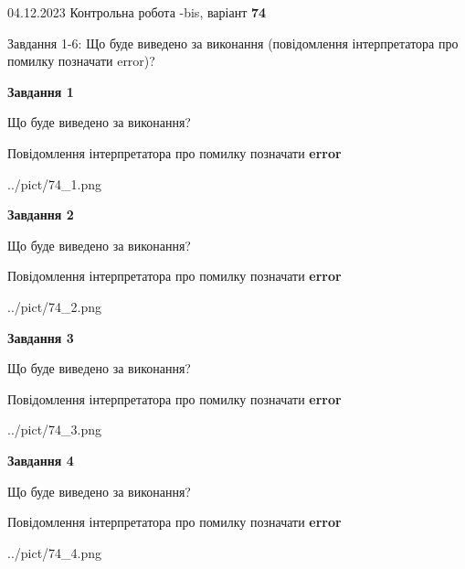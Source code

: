 \documentclass[12pt, ukrainian]{article}
\begin{document}
{{04.12.2023 Контрольна робота -bis, варіант  \No \textbf { 74 }\par}}
{

Завдання 1-6: Що буде виведено за виконання (повідомлення інтерпретатора про помилку позначати error)?


{\begin {center}\textbf{Завдання 1}\end {center}}\par
Що буде виведено за виконання? \par
Повідомлення інтерпретатора про помилку позначати \textbf{error}

\begin{center}
	{../pict/74_1.png}
\end{center}
\newpage

{\begin {center}\textbf{Завдання 2}\end {center}}\par
Що буде виведено за виконання? \par
Повідомлення інтерпретатора про помилку позначати \textbf{error}

\begin{center}
	{../pict/74_2.png}
\end{center}
\newpage

{\begin {center}\textbf{Завдання 3}\end {center}}\par
Що буде виведено за виконання? \par
Повідомлення інтерпретатора про помилку позначати \textbf{error}

\begin{center}
	{../pict/74_3.png}
\end{center}
\newpage

{\begin {center}\textbf{Завдання 4}\end {center}}\par
Що буде виведено за виконання? \par
Повідомлення інтерпретатора про помилку позначати \textbf{error}

\begin{center}
	{../pict/74_4.png}
\end{center}
\newpage

}
\end{document}
